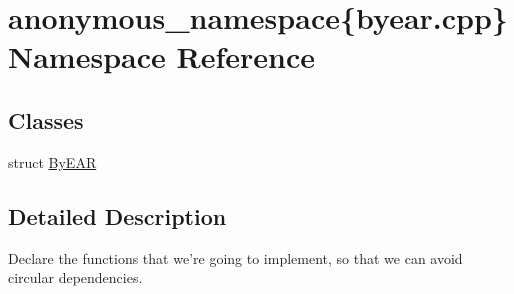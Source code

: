 \hypertarget{namespaceanonymous__namespace_02byear_8cpp_03}{\section{anonymous\-\_\-namespace\{byear.\-cpp\} Namespace Reference}
\label{namespaceanonymous__namespace_02byear_8cpp_03}
}
\subsection*{Classes}
\begin{DoxyCompactItemize}
\item 
struct \hyperlink{structanonymous__namespace_02byear_8cpp_03_1_1ByEAR}{By\-E\-A\-R}
\end{DoxyCompactItemize}


\subsection{Detailed Description}
Declare the functions that we're going to implement, so that we can avoid circular dependencies. 